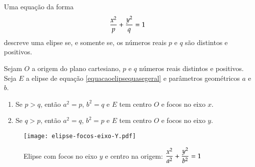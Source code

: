 \begin{proposicao}
  Uma equa\c{c}\~ao da forma
  \begin{equation}\label{equacaoelipsequasegeral}
    \dfrac{x^2}{p} + \dfrac{y^2}{q} = 1
  \end{equation}
  descreve uma elipse se, e somente se, os n\'umeros reais $p$ e $q$ s\~ao distintos e positivos.
\end{proposicao}

\begin{corolario}
  Sejam $O$ a origem do plano cartesiano, $p$ e $q$ n\'umeros reais distintos e positivos. Seja $E$ a elipse de equa\c{c}\~ao \eqref{equacaoelipsequasegeral} e par\^ametros geom\'etricos $a$ e $b$.
  \begin{enumerate}
    \item Se $p > q$, ent\~ao $a^2 = p$, $b^2 = q$ e $E$ tem centro $O$ e focos no eixo $x$.
    \item Se $q > p$, ent\~ao $a^2 = q$, $b^2 = p$ e $E$ tem centro $O$ e focos no eixo $y$.
  \end{enumerate}
\end{corolario}

\begin{figure}[h]
  \centering
  \caption{Elipse com focos no eixo $y$ e centro na origem: $\dfrac{x^2}{a^2} + \dfrac{y^2}{b^2} = 1$}
  \texttt{[image: elipse-focos-eixo-Y.pdf]}
\end{figure}


